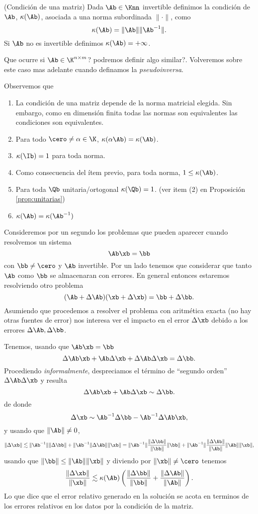 \begin{defi}{(Condición de una matriz)}
Dada $\Ab\in \Knn$ invertible definimos la condición de $\Ab$, $\kappa(\Ab)$, asociada a una norma subordinada $\|\cdot\|$, como
$$
\kappa(\Ab)=\|\Ab\|\|\Ab^{-1}\|.
$$
Si $\Ab$ no es invertible definimos $\kappa(\Ab)=+\infty$.

\end{defi}
Que ocurre si $\Ab\in \K^{n\times m}$? podremos definir algo similar?.  Volveremos sobre este caso mas adelante cuando definamos la \emph{pseudoinversa}.
\begin{remark}
\label{rem:deCondicion}
Observemos que
\begin{enumerate}
 \item La condición de una matriz depende de la norma matricial elegida. Sin embargo, como en dimensión finita todas las normas son equivalentes las condiciones son equivalentes.
\item Para todo $\cero\neq \alpha\in \K$, $\kappa(\alpha\Ab)=\kappa(\Ab)$.
\item $\kappa(\Ib)=1$ para toda norma.
 \item Como consecuencia del ítem previo, para toda norma, $1\le \kappa(\Ab)$.
\item Para toda $\Qb$ unitaria/ortogonal
$\kappa(\Qb)=1$. (ver item (2) en Proposición \ref{prop:unitarias})
\item $\kappa(\Ab)=\kappa(\Ab^{-1})$
\end{enumerate}
\end{remark}
Consideremos por un segundo los problemas que pueden aparecer cuando resolvemos un sistema
$$
\Ab\xb=\bb
$$
con $\bb\neq\cero$ y $\Ab$ invertible.
Por un lado tenemos que considerar que tanto $\Ab$ como $\bb$ se almacenaran con errores. En general entonces estaremos resolviendo otro problema
$$
(\Ab+\Delta\Ab)(\xb+\Delta \xb)=
\bb +\Delta \bb.
$$
Asumiendo que procedemos a resolver el problema con aritmética exacta (no hay otras fuentes de error) nos interesa ver el impacto en el error $\Delta \xb$ debido a los errores $\Delta \Ab,\Delta \bb$.

Tenemos, usando que $\Ab\xb=\bb$
$$
\Delta \Ab\xb+\Ab\Delta\xb+\Delta \Ab\Delta \xb=\Delta \bb.
$$
Procediendo \emph{informalmente}, despreciamos el término de ``segundo orden'' $\Delta \Ab\Delta \xb$ y resulta
$$
\Delta \Ab\xb+\Ab\Delta\xb \sim \Delta \bb.
$$
de donde
$$
\Delta \xb\sim \Ab^{-1}\Delta \bb-\Ab^{-1}\Delta \Ab\xb,
$$
y usando que $\|\Ab\|\neq 0$,
$$
\|\Delta \xb\|\lesssim \|\Ab^{-1}\|\|\Delta \bb\|+\|\Ab^{-1}\|\Delta \Ab\|\|\xb\|=\|\Ab^{-1}\|\frac{\|\Delta \bb\|}{\|\bb\|}\|\bb\|+\|\Ab^{-1}\|\frac{\|\Delta \Ab\|}{\|\Ab\|}\|\Ab\|\|\xb\|,
$$
usando que $\|\bb\|\le \|\Ab\|\|\xb\|$ y diviendo por $\|\xb\|\neq \cero$ tenemos
$$\frac{\|\Delta \xb\|}{\|\xb\|}\lesssim \kappa(\Ab)\left(\frac{\|\Delta \bb\|}{\|\bb\|}+ \frac{\|\Delta \Ab\|}{\|\Ab\|}\right).$$
Lo que dice que el error  relativo generado en la solución  se acota en terminos de los errores relativos en los datos por la condición de la matriz.

